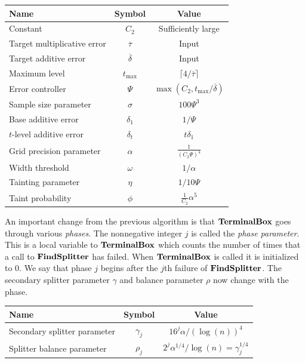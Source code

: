 \documentclass{acmsmall}
\newcommand{\terminalbox}{{\rm{\bf TerminalBox}}}
\newcommand{\deltapar}{\overline{\delta}}
\newcommand{\deltaval}{1/\errorcont}
\newcommand{\gridprecval}{\frac{1}{(C_2\errorcont)^4}}
\newcommand{\sszval}{100\errorcont^3}
\newcommand{\taint}{\eta}
\newcommand{\taintval}{1/10\errorcont}
\newcommand{\taintprob}{\phi}
\newcommand{\taupar}{\overline{\tau}}
\newcommand{\gridprec}{\alpha}
\newcommand{\errorcont}{\Psi}
\newcommand{\ssz}{\sigma}
\newcommand{\approxlis}{{\rm {\bf ApproxLIS}}}
\newcommand{\findsplitter}{{\rm {\bf FindSplitter}}}
\begin{document}
%
%
%
\begin{center}
  \begin{tabular}{ | l || c | c |}
    \hline
    {\bf Name} & {\bf Symbol} & {\bf Value} \\ \hline
Constant &  $C_2$ & Sufficiently large \\ \hline
                    Target multiplicative error& $\taupar$ & Input \\ \hline
		Target additive error & $\deltapar$ &  Input \\ \hline
		Maximum level & $t_{\max}$ & $\lceil 4/\taupar \rceil$ \\ \hline
    Error controller & $\errorcont$ & $\max(C_2, t_{\max}/\deltapar)$ \\ \hline
    Sample size parameter & $\ssz$ & $\sszval$ \\ \hline
    Base additive error & $\delta_1$ & $\deltaval$ \\ \hline
    $t$-level additive error & $\delta_t$ & $t\delta_1$ \\ \hline
    Grid precision parameter & $\gridprec$ & $\gridprecval$ \\ \hline
    Width threshold & $\omega$ & $1/\gridprec$ \\ \hline
    Tainting parameter & $\taint$ & $\taintval$ \\ \hline
    Taint probability & $\taintprob$ & $\frac{1}{C_2}\gridprec^5$    \\ \hline

  \end{tabular}
\end{center}
%


An important change from the previous algorithm is that $\terminalbox$ goes through various \emph{phases}. 
The nonnegative integer $j$ is called the {\em phase parameter}. This is a local variable to $\terminalbox$
which counts the number of times that a call to $\findsplitter$ has failed.  When $\terminalbox$ is called it
is initialized to 0.  We say that phase $j$ begins
after the $j$th failure of $\findsplitter$. The secondary splitter parameter $\gamma$ and balance parameter $\rho$ now
change with the phase.
%
\begin{center}
  \begin{tabular}{ | l || c | c |}
    \hline
    {\bf Name} & {\bf Symbol} & {\bf Value} \\ \hline
		Secondary splitter parameter & $\gamma_j$ & $16^j\gridprec/(\log(n))^4$ \\ \hline
    Splitter balance parameter & $\rho_j$ & $2^j \gridprec^{1/4}/\log(n) = \gamma_j^{1/4}$ \\ \hline
  \end{tabular}
\end{center}
%
\fi
\end{document}
